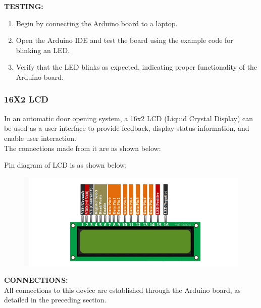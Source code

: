 \documentclass{article}
\begin{document}
\textbf{TESTING:}
\begin{enumerate}
\item Begin by connecting the Arduino board to a laptop.
\item Open the Arduino IDE and test the board using the example code for blinking an LED.
\item Verify that the LED blinks as expected, indicating proper functionality of the Arduino board.
\end{enumerate}



\subsubsection{16X2 LCD}
In an automatic door opening system, a 16x2 LCD (Liquid Crystal Display) can be used as a user interface to provide feedback, display status information, and enable user interaction. \\
The connections made from it are as shown below:

Pin diagram of LCD is as shown below:
\begin{figure}[H]
\centering
\includegraphics[scale = 0.4]{./figs/lcdpindia.png}
\end{figure}
\textbf{CONNECTIONS:\\}
All connections to this device are established through the Arduino board, as detailed in the preceding section.
\end{document}
